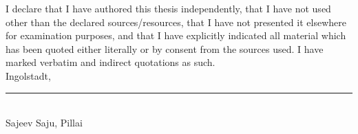 
I declare that I have authored this thesis independently, that I have not used other than the declared sources/resources, that I have not presented it elsewhere for examination purposes, and that I have explicitly indicated all material which has been quoted either literally or by consent from the sources used. I have marked verbatim and indirect quotations as such.	\\[2em]
	
Ingolstadt, \rule{0.3\textwidth}{0.4pt}	\\ [1.5cm]
	
Sajeev Saju, Pillai

